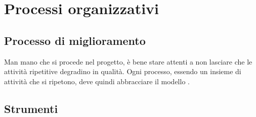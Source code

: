 \section{Processi organizzativi}

\subsection{Processo di miglioramento} %
Man mano che si procede nel progetto, è bene stare attenti a non lasciare che le attività ripetitive degradino in qualità. Ogni processo, essendo un insieme di attività che si ripetono, deve quindi abbracciare il modello . %

\subsection{Strumenti}


